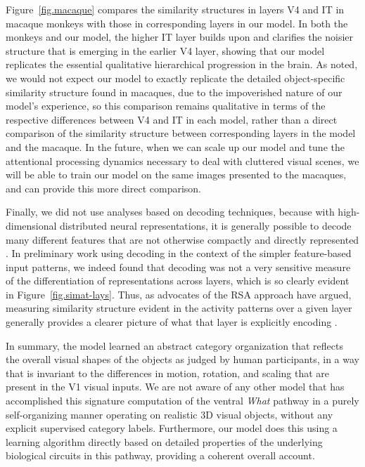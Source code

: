 \documentclass[11pt,twoside]{article}
\newif\myifpdf
\begin{document}
Figure~\ref{fig.macaque} compares the similarity structures in layers V4 and IT in macaque monkeys \citep{CadieuHongYaminsEtAl14} with those in corresponding layers in our model.  In both the monkeys and our model, the higher IT layer builds upon and clarifies the noisier structure that is emerging in the earlier V4 layer, showing that our model replicates the essential qualitative hierarchical progression in the brain.  As noted, we would not expect our model to exactly replicate the detailed object-specific similarity structure found in macaques, due to the impoverished nature of our model's experience, so this comparison remains qualitative in terms of the respective differences between V4 and IT in each model, rather than a direct comparison of the similarity structure between corresponding layers in the model and the macaque.  In the future, when we can scale up our model and tune the attentional processing dynamics necessary to deal with cluttered visual scenes, we will be able to train our model on the same images presented to the macaques, and can provide this more direct comparison.

Finally, we did not use analyses based on decoding techniques, because with high-dimensional distributed neural representations, it is generally possible to decode many different features that are not otherwise compactly and directly represented \citep{FusiMillerRigotti16}.  In preliminary work using decoding in the context of the simpler feature-based input patterns, we indeed found that decoding was not a very sensitive measure of the differentiation of representations across layers, which is so clearly evident in Figure~\ref{fig.simat-lays}.  Thus, as advocates of the RSA approach have argued, measuring similarity structure evident in the activity patterns over a given layer generally provides a clearer picture of what that layer is explicitly encoding \citep{KriegeskorteMurBandettini08}.

In summary, the model learned an abstract category organization that reflects the overall visual shapes of the objects as judged by human participants, in a way that is invariant to the differences in motion, rotation, and scaling that are present in the V1 visual inputs.  We are not aware of any other model that has accomplished this signature computation of the ventral \emph{What} pathway in a purely self-organizing manner operating on realistic 3D visual objects, without any explicit supervised category labels.  Furthermore, our model does this using a learning algorithm directly based on detailed properties of the underlying biological circuits in this pathway, providing a coherent overall account.
\end{document}
